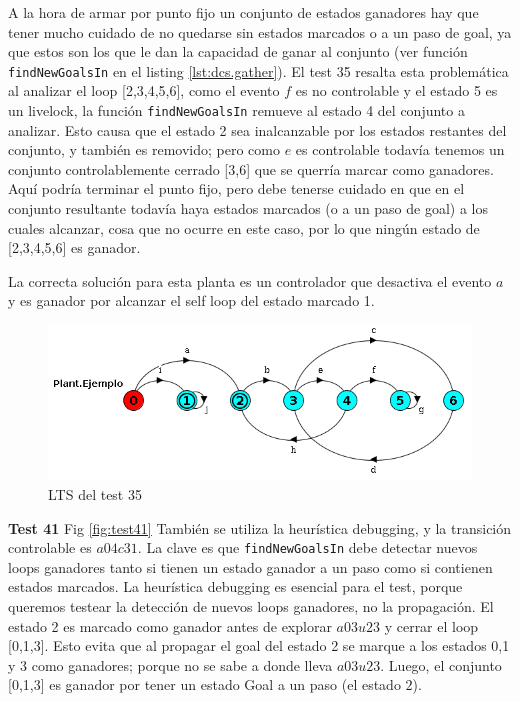 A la hora de armar por punto fijo un conjunto de estados ganadores hay que tener mucho cuidado de no quedarse sin estados marcados o a un paso de goal, ya que estos son los que le dan la capacidad de ganar al conjunto (ver función \texttt{findNewGoalsIn} en el listing \ref{lst:dcs.gather}). El test 35 resalta esta problemática al analizar el loop [2,3,4,5,6], como el evento $f$ es no controlable y el estado 5 es un livelock, la función \texttt{findNewGoalsIn} remueve al estado 4 del conjunto a analizar. Esto causa que el estado 2 sea inalcanzable por los estados restantes del conjunto, y también es removido; pero como $e$ es controlable todavía tenemos un conjunto controlablemente cerrado [3,6] que se querría marcar como ganadores. Aquí podría terminar el punto fijo, pero debe tenerse cuidado en que en el conjunto resultante todavía haya estados marcados (o a un paso de goal) a los cuales alcanzar, cosa que no ocurre en este caso, por lo que ningún estado de [2,3,4,5,6] es ganador.

La correcta solución para esta planta es un controlador que desactiva el evento $a$ y es ganador por alcanzar el self loop del estado marcado 1.

\begin{figure}[h]
 \centering
 \includegraphics[scale=0.7]{figures/tests/test35.png}
 \caption{LTS del test 35}
 \label{fig:test35}
\end{figure}

\FloatBarrier
\textbf{Test 41} Fig \ref{fig:test41}
También se utiliza la heurística debugging, y la transición controlable es $a04c31$. 
La clave es que \texttt{findNewGoalsIn} debe detectar nuevos loops ganadores tanto si tienen un estado ganador a un paso como si contienen estados marcados. 
La heurística debugging es esencial para el test, porque queremos testear la detección de nuevos loops ganadores, no la propagación. El estado 2 es marcado como ganador antes de explorar $a03u23$ y cerrar el loop [0,1,3]. Esto evita que al propagar el goal del estado 2 se marque a los estados 0,1 y 3 como ganadores; porque no se sabe a donde lleva $a03u23$.
Luego, el conjunto [0,1,3] es ganador por tener un estado Goal a un paso (el estado $2$).

